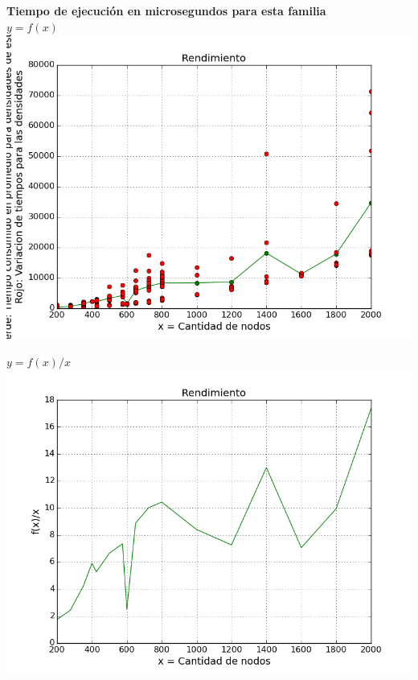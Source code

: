 \begin{center}
	\textbf{Tiempo de ejecuci\'on en microsegundos para esta familia}\\
	\textbf{$y = f(x)$}\\
	\includegraphics[scale=0.7]{experimentos/bqlocal/rendimiento_aristas_lineales/complexity_variation.png}
\end{center}

\begin{center}
	\textbf{$y = f(x)/x$}\\
	\includegraphics[scale=0.7]{experimentos/bqlocal/rendimiento_aristas_lineales/complexity_med_over_n.png}
\end{center}

